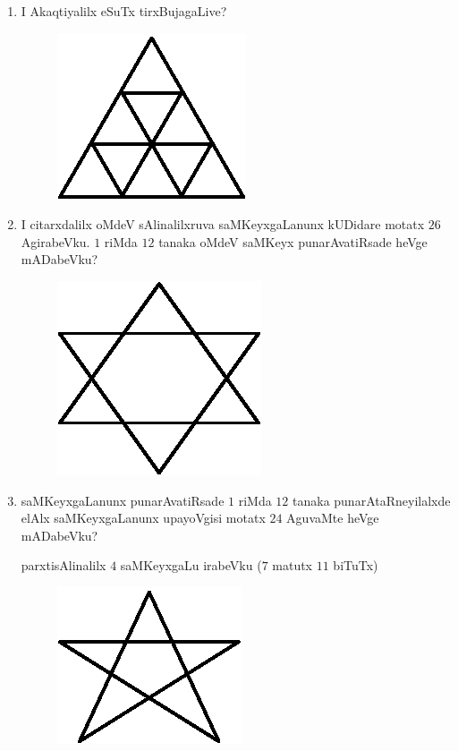 \begin{enumerate}
\item I Akaqtiyalilx eSuTx tirxBujagaLive?
\begin{figure}[H]
\centering
\includegraphics[scale=0.9]{src/figures/exr22.eps}
\end{figure}

\item I citarxdalilx oMdeV sAlinalilxruva saMKeyxgaLanunx kUDidare motatx $26$ AgirabeVku. $1$ riMda $12$ tanaka oMdeV saMKeyx punarAvatiRsade heVge mADabeVku?
\begin{figure}[H]
\centering
\includegraphics[scale=0.9]{src/figures/exr23.eps}
\end{figure}

\item saMKeyxgaLanunx punarAvatiRsade $1$ riMda $12$ tanaka punarAtaRneyilalxde elAlx saMKeyxgaLanunx upayoVgisi motatx $24$ AguvaMte heVge mADabeVku?

parxtisAlinalilx $4$ saMKeyxgaLu irabeVku ($7$ matutx $11$ biTuTx)
\begin{figure}[H]
\centering
\includegraphics[scale=0.9]{src/figures/exr24.eps}
\end{figure}


\end{enumerate}

